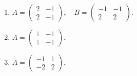 	 \paragraph{} %
		 \begin{enumerate}
			 \item %
			       $A = \begin{pmatrix}
					       2 & -1 \\
					       2 & -1
				       \end{pmatrix}, \quad
				       B = \begin{pmatrix}
					       -1 & -1 \\
					       2  & 2
				       \end{pmatrix}$.

			 \item %
			       $A = \begin{pmatrix}
					       1 & -1 \\
					       1 & -1
				       \end{pmatrix}$.

			 \item %
			       $A = \begin{pmatrix}
					       -1 & 1 \\
					       -2 & 2
				       \end{pmatrix}$.
		 \end{enumerate}


